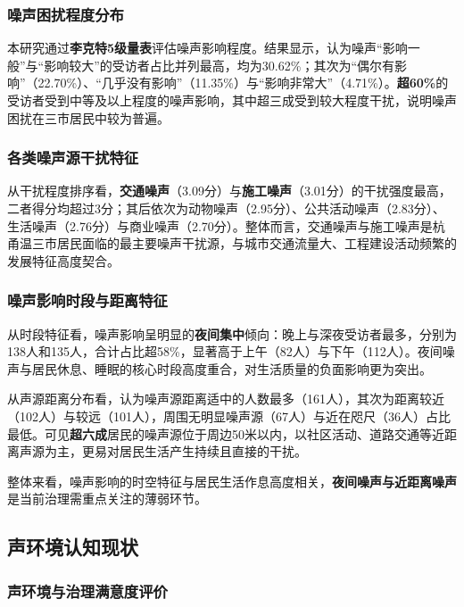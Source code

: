 \subsubsection{噪声困扰程度分布}

本研究通过\textbf{李克特5级量表}评估噪声影响程度。结果显示，认为噪声“影响一般”与“影响较大”的受访者占比并列最高，均为30.62\%；其次为“偶尔有影响”（22.70\%）、“几乎没有影响”（11.35\%）与“影响非常大”（4.71\%）。\textbf{超60\%}的受访者受到中等及以上程度的噪声影响，其中超三成受到较大程度干扰，说明噪声困扰在三市居民中较为普遍。

\subsubsection{各类噪声源干扰特征}

从干扰程度排序看，\textbf{交通噪声}（3.09分）与\textbf{施工噪声}（3.01分）的干扰强度最高，二者得分均超过3分；其后依次为动物噪声（2.95分）、公共活动噪声（2.83分）、生活噪声（2.76分）与商业噪声（2.70分）。整体而言，交通噪声与施工噪声是杭甬温三市居民面临的最主要噪声干扰源，与城市交通流量大、工程建设活动频繁的发展特征高度契合。

\subsubsection{噪声影响时段与距离特征}

从时段特征看，噪声影响呈明显的\textbf{夜间集中}倾向：晚上与深夜受访者最多，分别为138人和135人，合计占比超58\%，显著高于上午（82人）与下午（112人）。夜间噪声与居民休息、睡眠的核心时段高度重合，对生活质量的负面影响更为突出。

从声源距离分布看，认为噪声源距离适中的人数最多（161人），其次为距离较近（102人）与较远（101人），周围无明显噪声源（67人）与近在咫尺（36人）占比最低。可见\textbf{超六成}居民的噪声源位于周边50米以内，以社区活动、道路交通等近距离声源为主，更易对居民生活产生持续且直接的干扰。

整体来看，噪声影响的时空特征与居民生活作息高度相关，\textbf{夜间噪声与近距离噪声}是当前治理需重点关注的薄弱环节。

\subsection{声环境认知现状}


\subsubsection{声环境与治理满意度评价}


